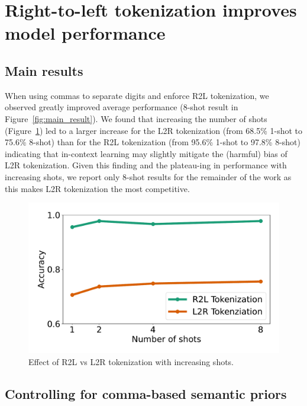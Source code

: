 \documentclass{article}
\theoremstyle{plain}
\theoremstyle{definition}
\theoremstyle{remark}
\begin{document}
\section{Right-to-left tokenization improves model performance}
\label{sec:R2L_overall}

\subsection{Main results}
\label{sec:comma_R2L}

When using commas to separate digits and enforce R2L tokenization, we observed greatly improved average performance (8-shot result in Figure~\ref{fig:main_result}). We found that increasing the number of shots (Figure~\ref{fig:token_dir_shots}) led to a larger increase for the L2R tokenization (from 68.5\% 1-shot to 75.6\% 8-shot) than for the R2L tokenization (from 95.6\%  1-shot to 97.8\% 8-shot) indicating that in-context learning may slightly mitigate the (harmful) bias of L2R tokenization. Given this finding and the plateau-ing in performance with increasing shots, we report only 8-shot results for the remainder of the work as this makes L2R tokenization the most competitive.

\begin{figure}[ht]
    \centering
    \vspace{-0.8em}
    \includegraphics[width=\columnwidth]{figures/r2l_v_l2r_w_shots.pdf}
    \vspace{-2em}
    \caption{Effect of R2L vs L2R tokenization with increasing shots.}
    \label{fig:token_dir_shots}
    \vspace{-1em}
\end{figure}

\subsection{Controlling for comma-based semantic priors}
\label{sec:control_delim}
\end{document}
